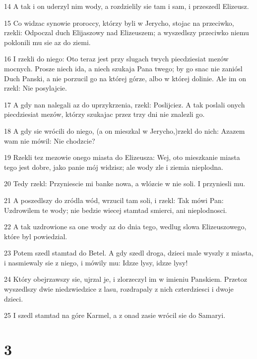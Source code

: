 \par 14 A tak i on uderzyl nim wody, a rozdzielily sie tam i sam, i przeszedl Elizeusz.
\par 15 Co widzac synowie proroccy, którzy byli w Jerycho, stojac na przeciwko, rzekli: Odpoczal duch Elijaszowy nad Elizeuszem; a wyszedlszy przeciwko niemu poklonili mu sie az do ziemi.
\par 16 I rzekli do niego: Oto teraz jest przy slugach twych piecdziesiat mezów mocnych. Prosze niech ida, a niech szukaja Pana twego; by go snac nie zaniósl Duch Panski, a nie porzucil go na której górze, albo w której dolinie. Ale im on rzekl: Nie posylajcie.
\par 17 A gdy nan nalegali az do uprzykrzenia, rzekl: Poslijciez. A tak poslali onych piecdziesiat mezów, którzy szukajac przez trzy dni nie znalezli go.
\par 18 A gdy sie wrócili do niego, (a on mieszkal w Jerycho,)rzekl do nich: Azazem wam nie mówil: Nie chodzcie?
\par 19 Rzekli tez mezowie onego miasta do Elizeusza: Wej, oto mieszkanie miasta tego jest dobre, jako panie mój widzisz; ale wody zle i ziemia nieplodna.
\par 20 Tedy rzekl: Przyniescie mi banke nowa, a wlózcie w nie soli. I przyniesli mu.
\par 21 A poszedlszy do zródla wód, wrzucil tam soli, i rzekl: Tak mówi Pan: Uzdrowilem te wody; nie bedzie wiecej stamtad smierci, ani nieplodnosci.
\par 22 A tak uzdrowione sa one wody az do dnia tego, wedlug slowa Elizeuszowego, które byl powiedzial.
\par 23 Potem szedl stamtad do Betel. A gdy szedl droga, dzieci male wyszly z miasta, i nasmiewaly sie z niego, i mówily mu: Idzze lysy, idzze lysy!
\par 24 Który obejrzawszy sie, ujrzal je, i zlorzeczyl im w imieniu Panskiem. Przetoz wyszedlszy dwie niedzwiedzice z lasu, rozdrapaly z nich czterdziesci i dwoje dzieci.
\par 25 I szedl stamtad na góre Karmel, a z onad zasie wrócil sie do Samaryi.

\chapter{3}

